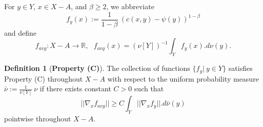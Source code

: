 \documentclass[12pt]{amsart}
\theoremstyle{definition}
\newtheorem{dfn}{Definition}
\theoremstyle{remark}
\newcommand{\bR}{\mathbb{R}}
\begin{document}









For $y\in Y$, $x\in X-A$, and $\beta\geq 2$, we abbreviate 
\begin{equation}\label{fy} f_y(x):=\frac{1}{1-\beta}~(c(x,y)-\psi(y))^{1-\beta} \end{equation} and define \begin{equation}\label{favgdef}
f_{avg}: X-A \to \bR, ~~~f_{avg}(x)=(\nu[Y])^{-1} \int_Y f_y(x).d\nu(y).
\end{equation}

\begin{dfn}[\textbf{Property (C)}] \label{a5spec}
The collection of functions $\{f_y|~y\in Y\}$ satisfies Property (C) throughout $X-A$ with respect to the uniform probability measure $\bar{\nu}:=\frac{1}{\nu[Y]}~\nu$ if there exists constant $C>0$ such that \begin{equation}
||\nabla_x f_{avg}|| \geq C \int_Y ||\nabla_x f_y||.d\bar{\nu}(y) \label{maxineq}
\end{equation}
pointwise throughout $X-A$.
\end{dfn}
\end{document}
